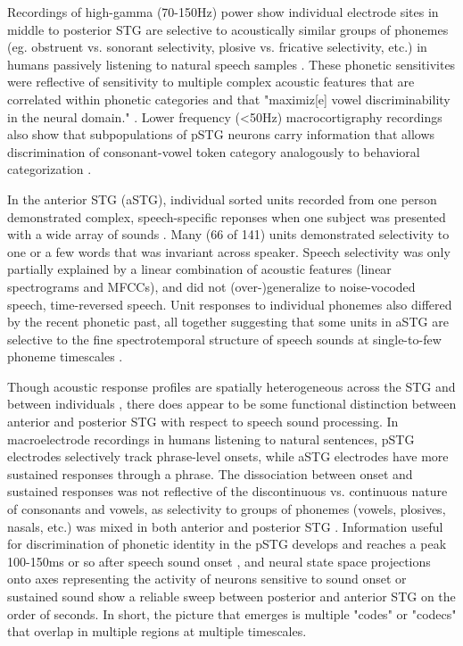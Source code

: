 Recordings of high-gamma (70-150Hz) power show individual electrode sites in middle to posterior STG are selective to acoustically similar groups of phonemes (eg. obstruent vs. sonorant selectivity, plosive vs. fricative selectivity, etc.) in humans passively listening to natural speech samples \citep{mesgaraniPhoneticFeatureEncoding2014}. These phonetic sensitivites were reflective of sensitivity to multiple complex acoustic features that are correlated within phonetic categories and that "maximiz[e] vowel discriminability in the neural domain." \citep{mesgaraniPhoneticFeatureEncoding2014}. Lower frequency (<50Hz) macrocortigraphy recordings also show that subpopulations of pSTG neurons carry information that allows discrimination of consonant-vowel token category analogously to behavioral categorization \citep{changCategoricalSpeechRepresentation2010b}. 

In the anterior STG (aSTG), individual sorted units recorded from one person demonstrated complex, speech-specific reponses when one subject was presented with a wide array of sounds \citep{chanSpeechSpecificTuningNeurons2014}. Many (66 of 141) units demonstrated selectivity to one or a few words that was invariant across speaker. Speech selectivity was only partially explained by a linear combination of acoustic features (linear spectrograms and MFCCs), and did not (over-)generalize to noise-vocoded speech, time-reversed speech. Unit responses to individual phonemes also differed by the recent phonetic past, all together suggesting that some units in aSTG are selective to the fine spectrotemporal structure of speech sounds at single-to-few phoneme timescales \citep{chanSpeechSpecificTuningNeurons2014}. 

Though acoustic response profiles are spatially heterogeneous across the STG and between individuals \citep{mesgaraniPhoneticFeatureEncoding2014,hamiltonSpatialMapOnset2018a}, there does appear to be some functional distinction between anterior and posterior STG with respect to speech sound processing. In macroelectrode recordings in humans listening to natural sentences, pSTG electrodes selectively track phrase-level onsets, while aSTG electrodes have more sustained responses through a phrase. The dissociation between onset and sustained responses was not reflective of the discontinuous vs. continuous nature of consonants and vowels, as selectivity to groups of phonemes (vowels, plosives, nasals, etc.) was mixed in both anterior and posterior STG \citep{hamiltonSpatialMapOnset2018a}. Information useful for discrimination of phonetic identity in the pSTG develops and reaches a peak 100-150ms or so after speech sound onset \citep{mesgaraniPhoneticFeatureEncoding2014,changCategoricalSpeechRepresentation2010b}, and neural state space projections onto axes representing the activity of neurons sensitive to sound onset or sustained sound show a reliable sweep between posterior and anterior STG on the order of seconds. In short, the picture that emerges is multiple "codes" or "codecs" that overlap in multiple regions at multiple timescales.

